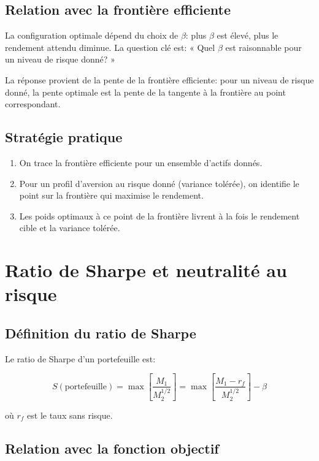 \documentclass[11pt,a4paper]{article}
\begin{document}
\subsection{Relation avec la frontière efficiente}

La configuration optimale dépend du choix de $\beta$: plus $\beta$ est élevé, plus le rendement attendu diminue. La question clé est: « Quel $\beta$ est raisonnable pour un niveau de risque donné? »

La réponse provient de la pente de la frontière efficiente: pour un niveau de risque donné, la pente optimale est la pente de la tangente à la frontière au point correspondant.

\subsection{Stratégie pratique}

\begin{enumerate}
\item On trace la frontière efficiente pour un ensemble d'actifs donnés.
\item Pour un profil d'aversion au risque donné (variance tolérée), on identifie le point sur la frontière qui maximise le rendement.
\item Les poids optimaux à ce point de la frontière livrent à la fois le rendement cible et la variance tolérée.
\end{enumerate}

\section{Ratio de Sharpe et neutralité au risque}

\subsection{Définition du ratio de Sharpe}

Le ratio de Sharpe d'un portefeuille est:

\[
S(\text{portefeuille}) = \max \left[ \frac{M_1}{M_2^{1/2}} \right] = \max \left[ \frac{M_1 - r_f}{M_2^{1/2}} \right] - \beta
\]

où $r_f$ est le taux sans risque.

\subsection{Relation avec la fonction objectif}
\end{document}
